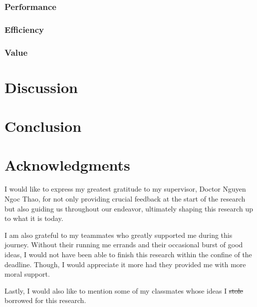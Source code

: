 \documentclass[conference]{IEEEtran}
\begin{document}
\subsubsection{Performance}


\subsubsection{Efficiency}

\subsubsection{Value}


\section{Discussion}

\section{Conclusion}

\section{Acknowledgments}
I would like to express my greatest gratitude to my supervisor,
Doctor Nguyen Ngoc Thao, for not only providing crucial feedback at the start
of the research but also guiding us throughout our endeavor, ultimately shaping
this research up to what it is today.

I am also grateful to my teammates who greatly supported me during
this journey. Without their running me errands and their occasional burst of
good ideas, I would not have been able to finish this research within the
confine of the deadline. Though, I would appreciate it more had they
provided me with more moral support.

Lastly, I would also like to mention some of my classmates whose ideas I
\sout{stole} borrowed for this research.



\end{document}
